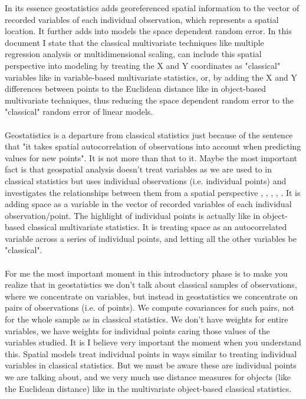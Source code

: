\documentclass {article}
\begin{document}
In its essence geostatistics adds georeferenced spatial information to the vector of recorded variables of each individual observation, which represents a spatial location.
 It further adds into models the space dependent random error. 
In this document I state that the classical multivariate techniques like multiple regression analysis or multidimensional scaling, can include this spatial perspective into modeling by treating the X and Y coordinates as "classical" variables like in variable-based multivariate statistics, or, by adding the X and Y differences between points to the Euclidean distance like in object-based multivariate techniques, thus reducing the space dependent random error to the "classical" random error of linear models.   
\\
\\
Geostatistics is a departure from classical statistics just because of the sentence that "it takes spatial autocorrelation of observations into account when predicting values for new points". It is not more than that to it.
Maybe the most important fact is that geospatial analysis doesn't treat variables as we are used to in classical statistics but uses individual observations (i.e. individual points) and investigates the relationships between them from a spatial perspective \cite{cressie_statistics_1993}, \cite{webster_geostatistics_2007}, \cite{isaaks_applied_1989}, \cite{hengl_practical_2009}, \cite{johnston_using_2003}.
 It is adding space as a variable in the vector of recorded variables of each individual observation/point. The highlight of individual points is actually like in object-based classical multivariate statistics. It is treating space as an autocorrelated variable across a series of individual points, and letting all the other variables be "classical". 
\\
\\
For me the most important moment in this introductory phase is to make you realize that in geostatistics we don't talk about classical samples of observations, where we concentrate on variables, but instead in geostatistics we concentrate on pairs of observations (i.e. of points). 
We compute covariances for such pairs, not for the whole sample as in classical statistics. We don't have weights for entire variables, we have weights for individual points caring those values of the variables studied. 
It is I believe very important the moment when you understand this. Spatial models treat individual points in ways similar to treating individual variables in classical statistics. But we must be aware these are individual points we are talking about, and we very much use distance measures for objects (like the Euclidean distance) like in the multivariate object-based classical statistics.
\end{document}
